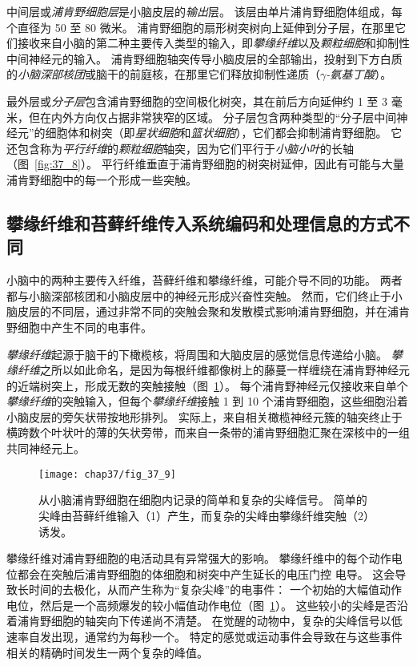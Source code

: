 中间层或\textit{浦肯野细胞层}是小脑皮层的\textit{输出}层。
该层由单片浦肯野细胞体组成，每个直径为 50 至 80 微米。
浦肯野细胞的扇形树突树向上延伸到分子层，在那里它们接收来自小脑的第二种主要传入类型的输入，即\textit{攀缘纤维}以及\textit{颗粒细胞}和抑制性中间神经元的输入。
浦肯野细胞轴突传导小脑皮层的全部输出，投射到下方白质的\textit{小脑深部核团}或脑干的前庭核，在那里它们释放抑制性递质（\textit{$\gamma$-氨基丁酸}）。


最外层或\textit{分子层}包含浦肯野细胞的空间极化树突，其在前后方向延伸约 1 至 3 毫米，但在内外方向仅占据非常狭窄的区域。
分子层包含两种类型的“分子层中间神经元”的细胞体和树突（即\textit{星状细胞}和\textit{篮状细胞}），它们都会抑制浦肯野细胞。
它还包含称为\textit{平行纤维}的\textit{颗粒细胞}轴突，因为它们平行于\textit{小脑小叶}的长轴（图~\ref{fig:37_8}）。
平行纤维垂直于浦肯野细胞的树突树延伸，因此有可能与大量浦肯野细胞中的每一个形成一些突触。


\subsection{攀缘纤维和苔藓纤维传入系统编码和处理信息的方式不同}

小脑中的两种主要传入纤维，苔藓纤维和攀缘纤维，可能介导不同的功能。
两者都与小脑深部核团和小脑皮层中的神经元形成兴奋性突触。
然而，它们终止于小脑皮层的不同层，通过非常不同的突触会聚和发散模式影响浦肯野细胞，并在浦肯野细胞中产生不同的电事件。


\textit{攀缘纤维}起源于脑干的下橄榄核，将周围和大脑皮层的感觉信息传递给小脑。
\textit{攀缘纤维}之所以如此命名，是因为每根纤维都像树上的藤蔓一样缠绕在浦肯野神经元的近端树突上，形成无数的突触接触（图~\ref{fig:37_9}）。
每个浦肯野神经元仅接收来自单个\textit{攀缘纤维}的突触输入，但每个\textit{攀缘纤维}接触 1 到 10 个浦肯野细胞，这些细胞沿着小脑皮层的旁矢状带按地形排列。
实际上，来自相关橄榄神经元簇的轴突终止于横跨数个叶状叶的薄的矢状旁带，而来自一条带的浦肯野细胞汇聚在深核中的一组共同神经元上。


\begin{figure}[htbp]
	\centering
	\texttt{[image: chap37/fig\_37\_9]}
	\caption{从小脑浦肯野细胞在细胞内记录的简单和复杂的尖峰信号。
		简单的尖峰由苔藓纤维输入（1）产生，而复杂的尖峰由攀缘纤维突触（2）诱发\cite{martinez1971electrogenesis}。}
	\label{fig:37_9}
\end{figure}


攀缘纤维对浦肯野细胞的电活动具有异常强大的影响。
攀缘纤维中的每个动作电位都会在突触后浦肯野细胞的体细胞和树突中产生延长的电压门控  电导。
这会导致长时间的去极化，从而产生称为“复杂尖峰”的电事件：
一个初始的大幅值动作电位，然后是一个高频爆发的较小幅值动作电位（图~\ref{fig:37_9}）。
这些较小的尖峰是否沿着浦肯野细胞的轴突向下传递尚不清楚。
在觉醒的动物中，复杂的尖峰信号以低速率自发出现，通常约为每秒一个。
特定的感觉或运动事件会导致在与这些事件相关的精确时间发生一两个复杂的峰值。


